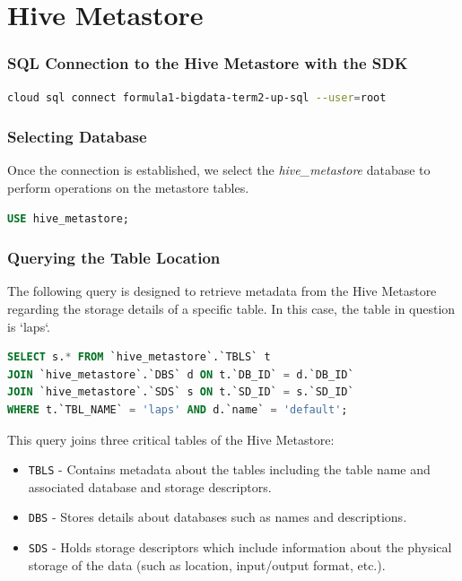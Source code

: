 \documentclass{article}
\begin{document}
\section{Hive Metastore}
\subsubsection{SQL Connection to the Hive Metastore with the SDK}
\begin{lstlisting}[language=bash]
cloud sql connect formula1-bigdata-term2-up-sql --user=root
\end{lstlisting}

\subsubsection{Selecting Database}
Once the connection is established, we select the \textit{hive\_metastore} database to perform operations on the metastore tables.

\begin{lstlisting}[language=SQL]
USE hive_metastore;
\end{lstlisting}

\subsubsection{Querying the Table Location}
The following query is designed to retrieve metadata from the Hive Metastore regarding the storage details of a specific table. In this case, the table in question is `laps`. 

\begin{lstlisting}[language=SQL]
SELECT s.* FROM `hive_metastore`.`TBLS` t
JOIN `hive_metastore`.`DBS` d ON t.`DB_ID` = d.`DB_ID`
JOIN `hive_metastore`.`SDS` s ON t.`SD_ID` = s.`SD_ID`
WHERE t.`TBL_NAME` = 'laps' AND d.`name` = 'default';
\end{lstlisting}

This query joins three critical tables of the Hive Metastore:
\begin{itemize}
    \item \texttt{TBLS} - Contains metadata about the tables including the table name and associated database and storage descriptors.
    \item \texttt{DBS} - Stores details about databases such as names and descriptions.
    \item \texttt{SDS} - Holds storage descriptors which include information about the physical storage of the data (such as location, input/output format, etc.).
\end{itemize}
\end{document}
